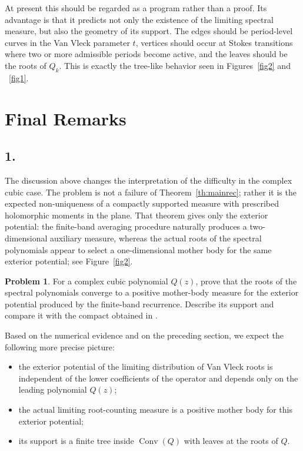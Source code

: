 \documentclass[10pt,twoside,a4paper,reqno]{amsart}
\theoremstyle{plain}
\theoremstyle{definition}
\newtheorem{pr}              {Problem}
\theoremstyle{remark}
\newenvironment{problem}{\begin{pr}}{\end{pr}}
\DeclareMathOperator{\Conv}{Conv}
\begin{document}
At present this should be regarded as a program rather than a proof.  Its advantage is that it predicts not only the existence of the limiting spectral measure, but also the geometry of its support.  The edges should be period-level curves in the Van Vleck parameter $t$, vertices should occur at Stokes transitions where two or more admissible periods become active, and the leaves should be the roots of $Q_k$.  This is exactly the tree-like behavior seen in Figures~\ref{fig2} and ~\ref{fig1}.


\section{Final Remarks}

\subsection*{1.} The discussion above changes the interpretation of the difficulty in the complex cubic case.  The problem is not a failure of Theorem~\ref{th:mainrec}; rather it is the expected non-uniqueness of a compactly supported measure with prescribed holomorphic moments in the plane.  That theorem gives only the exterior potential: the finite-band averaging procedure naturally produces a two-dimensional auxiliary measure, whereas the actual roots of the spectral polynomials appear to select a one-dimensional mother body for the same exterior potential; see Figure~\ref{fig2}.

\begin{problem}
For a complex cubic polynomial $Q(z)$, prove that the roots of the spectral polynomials converge to a positive mother-body measure for the exterior potential produced by the finite-band recurrence.  Describe its support and compare it with the compact obtained in \cite{ShT,STT}.
\end{problem}

Based on the numerical evidence and on the preceding section, we expect the following more precise picture:
\begin{itemize}
\item[(i)] the exterior potential of the limiting distribution of Van Vleck roots is independent of the lower coefficients of the operator and depends only on the leading polynomial $Q(z)$;
\item[(ii)] the actual limiting root-counting measure is a positive mother body for this exterior potential;
\item[(iii)] its support is a finite tree inside $\Conv(Q)$ with leaves at the roots of $Q$.
\end{itemize}
\end{document}
